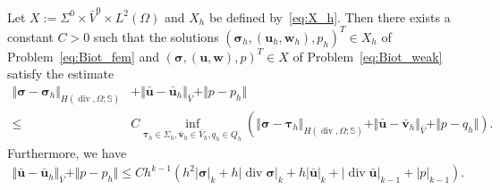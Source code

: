 \documentclass[10pt,a4paper]{amsart}
\def\btau{{\bm \tau}}
\def\bu{{\boldsymbol u}}
\def\bv{{\boldsymbol v}}
\def\bw{{\boldsymbol w}}
\renewcommand{\div}{\operatorname{div}}
\def\sig{{\bm \sigma}}
\begin{document}
\begin{theorem}\label{thm:near_best_approx}
Let $X:= \Sigma^0 \times \bar{V}^0 \times L^2(\Omega)$ and $X_h$ be defined by~\eqref{eq:X_h}.
Then there exists a constant $C >0$ such that the solutions $(\sig_h,(\bu_h,\bw_h),p_h)^T \in X_h$ of
Problem~\eqref{eq:Biot_fem} and $(\sig,(\bu,\bw),p)^T \in X$ of Problem~\eqref{eq:Biot_weak} satisfy
the estimate
%
\begin{align}\label{eq:near_best_approx}
\Vert \sig - \sig_h \Vert_{H(\div,\Omega;\mathbb{S})} &+ \Vert \bar{\bu} - \bar{\bu}_h \Vert_{\bar{V}} + \Vert p - p_h \Vert  \nonumber  \\
\le &C \inf_{\btau_h \in \Sigma_h,\bar{\bv}_h \in \bar{V}_h, q_h \in Q_h}
  \left(
\Vert \sig - \btau_h \Vert_{H(\div,\Omega;\mathbb{S})} \right. \left.+ \Vert \bar{\bu} - \bar{\bv}_h \Vert_{\bar{V}} + \Vert p - q_h \Vert
\right).
\end{align} 
Furthermore, we have 
\begin{align}\label{eq:near_best_approx_suboptimal}
 \Vert \bar{\bu} - \bar{\bu}_h \Vert_{\bar{V}} +\Vert p - p_h \Vert \le C h^{k-1}\left(h^2|\sig|_k+h|\div\sig|_k+h|\bar{\bu}|_k+|\div\bar{\bu}|_{k-1}+|p|_{k-1}\right).
 \end{align}
\end{theorem}
\end{document}
